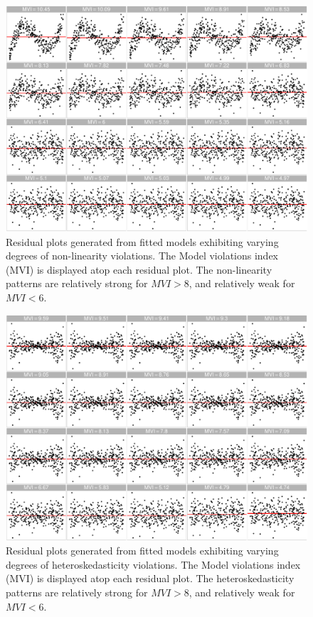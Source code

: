 \documentclass[]{interact}
\theoremstyle{plain}%
\theoremstyle{definition}
\theoremstyle{remark}
\begin{document}
\begin{figure}[!h]

{\centering \includegraphics[width=1\linewidth]{paper_files/figure-latex/poly-index-1} 

}

\caption{Residual plots generated from fitted models exhibiting varying degrees of non-linearity violations. The Model violations index (MVI) is displayed atop each residual plot. The non-linearity patterns are relatively strong for $MVI > 8$, and relatively weak for $MVI < 6$.}\label{fig:poly-index}
\end{figure}

\begin{figure}[!h]

{\centering \includegraphics[width=1\linewidth]{paper_files/figure-latex/heter-index-1} 

}

\caption{Residual plots generated from fitted models exhibiting varying degrees of heteroskedasticity violations. The Model violations index (MVI) is displayed atop each residual plot. The heteroskedasticity patterns are relatively strong for $MVI > 8$, and relatively weak for $MVI < 6$.}\label{fig:heter-index}
\end{figure}
\end{document}
